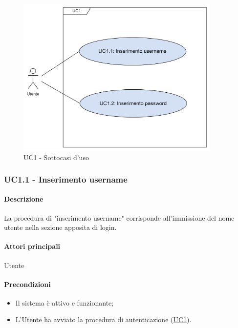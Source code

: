 \begin{figure}[H]
  \centering
  \includegraphics[width=0.90\textwidth]{assets/uc1_1.png}
  \caption{UC1 - Sottocasi d'uso}
\end{figure}


\subsubsection{UC1.1 - Inserimento username}\label{UC1point1}

\paragraph*{Descrizione}
La procedura di "inserimento username" corrisponde all'immissione del nome utente nella sezione apposita di login.

\paragraph*{Attori principali}
Utente

\paragraph*{Precondizioni}
\begin{itemize}
  \item Il sistema è attivo e funzionante;
  \item L'Utente ha avviato la procedura di autenticazione (\hyperref[UC1]{UC1}).  
\end{itemize}

